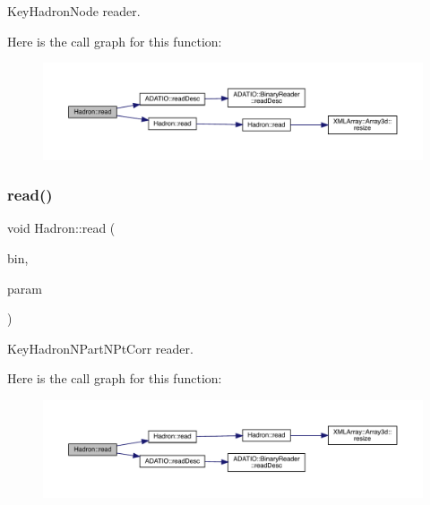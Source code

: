 Key\+Hadron\+Node reader. 

Here is the call graph for this function\+:\nopagebreak
\begin{figure}[H]
\begin{center}
\leavevmode
\includegraphics[width=350pt]{d1/daf/namespaceHadron_a60758467521910899dec197e7fbc0ab4_cgraph}
\end{center}
\end{figure}
\mbox{\label{namespaceHadron_a51412e3f2ebc9c4d67ed1cc397c4d546}} 
\subsubsection{\texorpdfstring{read()}{read()}\hspace{0.1cm}{\footnotesize\ttfamily [55/94]}}
{\footnotesize\ttfamily void Hadron\+::read (\begin{DoxyParamCaption}\item[{\mbox{\hyperlink{classADATIO_1_1BinaryReader}{Binary\+Reader}} \&}]{bin,  }\item[{\mbox{\hyperlink{structHadron_1_1KeyHadronNPartNPtCorr__t}{Key\+Hadron\+N\+Part\+N\+Pt\+Corr\+\_\+t}} \&}]{param }\end{DoxyParamCaption})}



Key\+Hadron\+N\+Part\+N\+Pt\+Corr reader. 

Here is the call graph for this function\+:\nopagebreak
\begin{figure}[H]
\begin{center}
\leavevmode
\includegraphics[width=350pt]{d1/daf/namespaceHadron_a51412e3f2ebc9c4d67ed1cc397c4d546_cgraph}
\end{center}
\end{figure}
\mbox{\label{namespaceHadron_ac6d19c651cf61c129b5cf86c15d13ab5}} 
